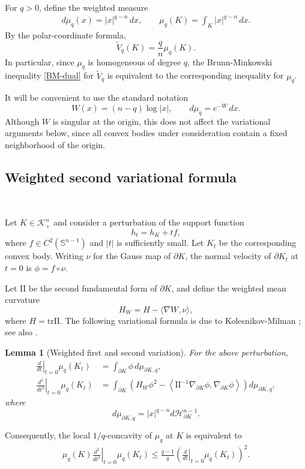 \documentclass[12pt,leqno]{amsart}
\theoremstyle{plain} \newtheorem{thm}{Theorem}[section]
\theoremstyle{plain} \newtheorem{prop}[thm]{Proposition}
\theoremstyle{plain} \newtheorem{prob}[thm]{Problem}
\theoremstyle{definition} \newtheorem{defi}[thm]{Definition}
\theoremstyle{plain} \newtheorem{cor}[thm]{Corollary}
\theoremstyle{plain} \newtheorem{lem}[thm]{Lemma}
\theoremstyle{plain} \newtheorem{eg}{Example}[section]
\theoremstyle{remark} \newtheorem{rmk}[thm]{Remark}
\theoremstyle{plain} \newtheorem{conj}{Conjecture}
\numberwithin{equation}{section}
\newcommand{\bS}{\mathbb{S}}
\newcommand{\cK}{\mathcal{K}}
\newcommand{\cH}{\mathcal{H}}
\newcommand{\tr}{\mathrm{tr}}
\newcommand{\II}{\mathrm{II}}
\newcommand{\tV}{\widetilde V}
\begin{document}
For $q>0$, define the weighted measure
\begin{align}\label{mu-q}
    d\mu_q(x)=|x|^{q-n}\,dx,\qquad 
    \mu_q(K)=\int_K |x|^{q-n}\,dx.
\end{align}
By the polar-coordinate formula,
\[
    \tV_q(K)=\frac qn \mu_q(K).
\]
In particular, since $\mu_q$ is homogeneous of degree $q$, the Brunn-Minkowski inequality \eqref{BM-dual} for $\tV_q$ is equivalent to the corresponding inequality for $\mu_q$.

It will be convenient to use the standard notation
\[
W(x)=(n-q)\log |x|,\qquad d\mu_q=e^{-W}\,dx.
\]
Although $W$ is singular at the origin, this does not affect the variational arguments below, since all convex bodies under consideration contain a fixed neighborhood of the origin.

\subsection{Weighted second variational formula}\

Let $K\in \cK_+^n$ and consider a perturbation of the support function
\[
    h_t=h_K+t f,
\]
where $f\in C^2(\bS^{n-1})$ and $|t|$ is sufficiently small. Let $K_t$ be the corresponding convex body. Writing $\nu$ for the Gauss map of $\partial K$, the normal velocity of $\partial K_t$ at $t=0$ is $ \phi=f\circ\nu$.

Let $\II$ be the second fundamental form of $\partial K$, and define the weighted mean curvature
\[
    H_W=H-\langle \nabla W,\nu\rangle,
\]
where $H=\tr \II$. The following variational formula is due to Kolesnikov-Milman \cite{KM18}; see also \cite[Eq.~(10)]{SZ25}.

\begin{lem}[Weighted first and second variation]\label{lem-variation}
For the above perturbation,
\begin{align}
    \left.\frac{d}{dt}\right|_{t=0}\mu_q(K_t)
    &=\int_{\partial K}\phi\,d\mu_{\partial K,q},\\
    \left.\frac{d^2}{dt^2}\right|_{t=0}\mu_q(K_t)
    &=\int_{\partial K}\left(H_W\phi^2-\left\langle \II^{-1}\nabla_{\partial K}\phi,\nabla_{\partial K}\phi\right\rangle\right)d\mu_{\partial K,q},
\end{align}
where
\[
    d\mu_{\partial K,q}=|x|^{q-n}d\cH^{n-1}_{\partial K}.
\]
\end{lem}

Consequently, the local $1/q$-concavity of $\mu_q$ at $K$ is equivalent to
\begin{align}\label{local-concavity}
    \mu_q(K)\left.\frac{d^2}{dt^2}\right|_{t=0}\mu_q(K_t)
    \leq \frac{q-1}{q}
    \left(\left.\frac{d}{dt}\right|_{t=0}\mu_q(K_t)\right)^2.
\end{align}
\end{document}
